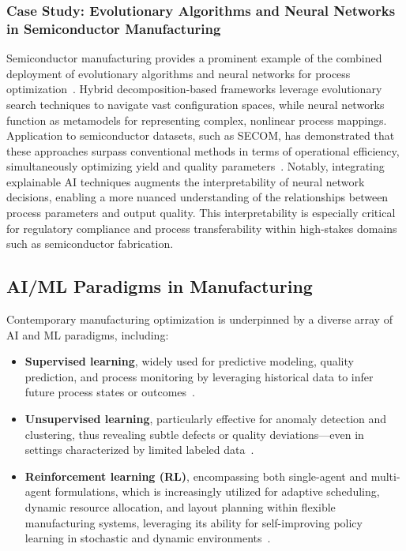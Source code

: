 \subsubsection{Case Study: Evolutionary Algorithms and Neural Networks in Semiconductor Manufacturing}

Semiconductor manufacturing provides a prominent example of the combined deployment of evolutionary algorithms and neural networks for process optimization~\cite{ref22}. Hybrid decomposition-based frameworks leverage evolutionary search techniques to navigate vast configuration spaces, while neural networks function as metamodels for representing complex, nonlinear process mappings. Application to semiconductor datasets, such as SECOM, has demonstrated that these approaches surpass conventional methods in terms of operational efficiency, simultaneously optimizing yield and quality parameters~\cite{ref22}. Notably, integrating explainable AI techniques augments the interpretability of neural network decisions, enabling a more nuanced understanding of the relationships between process parameters and output quality. This interpretability is especially critical for regulatory compliance and process transferability within high-stakes domains such as semiconductor fabrication.

\subsection{AI/ML Paradigms in Manufacturing}

Contemporary manufacturing optimization is underpinned by a diverse array of AI and ML paradigms, including:
\begin{itemize}
    \item \textbf{Supervised learning}, widely used for predictive modeling, quality prediction, and process monitoring by leveraging historical data to infer future process states or outcomes~\cite{ref2,ref6,ref13,ref14,ref19,ref20,ref27,ref30,ref37,ref38,ref42,ref44,ref45,ref50,ref52}.
    \item \textbf{Unsupervised learning}, particularly effective for anomaly detection and clustering, thus revealing subtle defects or quality deviations—even in settings characterized by limited labeled data~\cite{ref20,ref27}.
    \item \textbf{Reinforcement learning (RL)}, encompassing both single-agent and multi-agent formulations, which is increasingly utilized for adaptive scheduling, dynamic resource allocation, and layout planning within flexible manufacturing systems, leveraging its ability for self-improving policy learning in stochastic and dynamic environments~\cite{ref6,ref13,ref14,ref19,ref30,ref38,ref44,ref56}.
\end{itemize}

